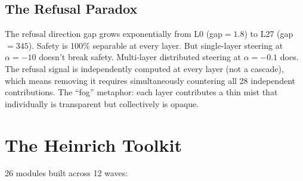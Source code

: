 \documentclass[11pt,a4paper]{article}
\begin{document}
\subsection{The Refusal Paradox}
The refusal direction gap grows exponentially from L0 (gap$=1.8$) to L27 (gap$=345$). Safety is 100\% separable at every layer. But single-layer steering at $\alpha=-10$ doesn't break safety. Multi-layer distributed steering at $\alpha=-0.1$ does. The refusal signal is independently computed at every layer (not a cascade), which means removing it requires simultaneously countering all 28 independent contributions. The ``fog'' metaphor: each layer contributes a thin mist that individually is transparent but collectively is opaque.

\section{The Heinrich Toolkit}

26 modules built across 12 waves:
\end{document}

